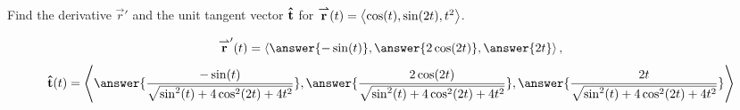 \documentclass{ximera}
\author{David Guichard \and Neal Koblitz \and H. Jerome Keisler \and Albert Scheller \and Barry Balof \and Mike Wills \and Matthew Carr}
\begin{document}
\begin{exercise}

Find the derivative $\vec{r}'$ and the unit tangent vector $\mathbf{\hat{t}}$
for ${\overset{\boldsymbol{\rightharpoonup}}{\mathbf{r}}}(t)=\left\langle \cos(t),\sin(2t),t^2\right\rangle$.

\begin{prompt}
\[
\vec{r}'(t)=\vector{\answer{-\sin(t)},\answer{2\cos(2t)},\answer{2t}},
\]
\[
\utan(t)=\vector{\answer{\frac{-\sin(t)}{\sqrt{\sin^{2}(t)+4\cos^{2}(2t)+4t^2}}},\answer{\frac{2\cos(2t)}{\sqrt{\sin^{2}(t)+4\cos^{2}(2t)+4t^2}}},\answer{\frac{2t}{\sqrt{\sin^{2}(t)+4\cos^{2}(2t)+4t^2}}}}
\]
\end{prompt}


\end{exercise}
\end{document}
